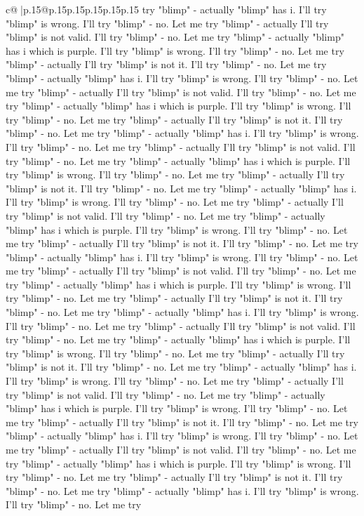 \documentclass{article}
\begin{document}
{\begin{supertabular}{c@{$\;$}|p{.15\linewidth}@{}p{.15\linewidth}p{.15\linewidth}p{.15\linewidth}p{.15\linewidth}p{.15\linewidth}}
{{{try "blimp" {-} actually "blimp" has i. I'll try "blimp" is wrong. I'll try "blimp" {-} no. Let me try "blimp" {-} actually I'll try "blimp" is not valid. I'll try "blimp" {-} no. Let me try "blimp" {-} actually "blimp" has i which is purple. I'll try "blimp" is wrong. I'll try "blimp" {-} no. Let me try "blimp" {-} actually I'll try "blimp" is not it. I'll try "blimp" {-} no. Let me try "blimp" {-} actually "blimp" has i. I'll try "blimp" is wrong. I'll try "blimp" {-} no. Let me try "blimp" {-} actually I'll try "blimp" is not valid. I'll try "blimp" {-} no. Let me try "blimp" {-} actually "blimp" has i which is purple. I'll try "blimp" is wrong. I'll try "blimp" {-} no. Let me try "blimp" {-} actually I'll try "blimp" is not it. I'll try "blimp" {-} no. Let me try "blimp" {-} actually "blimp" has i. I'll try "blimp" is wrong. I'll try "blimp" {-} no. Let me try "blimp" {-} actually I'll try "blimp" is not valid. I'll try "blimp" {-} no. Let me try "blimp" {-} actually "blimp" has i which is purple. I'll try "blimp" is wrong. I'll try "blimp" {-} no. Let me try "blimp" {-} actually I'll try "blimp" is not it. I'll try "blimp" {-} no. Let me try "blimp" {-} actually "blimp" has i. I'll try "blimp" is wrong. I'll try "blimp" {-} no. Let me try "blimp" {-} actually I'll try "blimp" is not valid. I'll try "blimp" {-} no. Let me try "blimp" {-} actually "blimp" has i which is purple. I'll try "blimp" is wrong. I'll try "blimp" {-} no. Let me try "blimp" {-} actually I'll try "blimp" is not it. I'll try "blimp" {-} no. Let me try "blimp" {-} actually "blimp" has i. I'll try "blimp" is wrong. I'll try "blimp" {-} no. Let me try "blimp" {-} actually I'll try "blimp" is not valid. I'll try "blimp" {-} no. Let me try "blimp" {-} actually "blimp" has i which is purple. I'll try "blimp" is wrong. I'll try "blimp" {-} no. Let me try "blimp" {-} actually I'll try "blimp" is not it. I'll try "blimp" {-} no. Let me try "blimp" {-} actually "blimp" has i. I'll try "blimp" is wrong. I'll try "blimp" {-} no. Let me try "blimp" {-} actually I'll try "blimp" is not valid. I'll try "blimp" {-} no. Let me try "blimp" {-} actually "blimp" has i which is purple. I'll try "blimp" is wrong. I'll try "blimp" {-} no. Let me try "blimp" {-} actually I'll try "blimp" is not it. I'll try "blimp" {-} no. Let me try "blimp" {-} actually "blimp" has i. I'll try "blimp" is wrong. I'll try "blimp" {-} no. Let me try "blimp" {-} actually I'll try "blimp" is not valid. I'll try "blimp" {-} no. Let me try "blimp" {-} actually "blimp" has i which is purple. I'll try "blimp" is wrong. I'll try "blimp" {-} no. Let me try "blimp" {-} actually I'll try "blimp" is not it. I'll try "blimp" {-} no. Let me try "blimp" {-} actually "blimp" has i. I'll try "blimp" is wrong. I'll try "blimp" {-} no. Let me try "blimp" {-} actually I'll try "blimp" is not valid. I'll try "blimp" {-} no. Let me try "blimp" {-} actually "blimp" has i which is purple. I'll try "blimp" is wrong. I'll try "blimp" {-} no. Let me try "blimp" {-} actually I'll try "blimp" is not it. I'll try "blimp" {-} no. Let me try "blimp" {-} actually "blimp" has i. I'll try "blimp" is wrong. I'll try "blimp" {-} no. Let me try }}}
\end{supertabular}}
\end{document}
